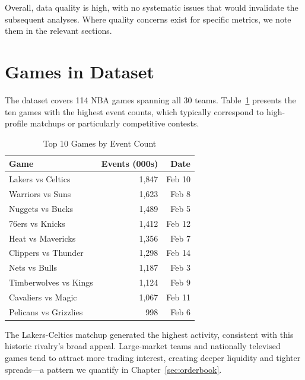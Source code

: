 Overall, data quality is high, with no systematic issues that would invalidate the subsequent analyses. Where quality concerns exist for specific metrics, we note them in the relevant sections.

\section{Games in Dataset}

The dataset covers 114 NBA games spanning all 30 teams. Table~\ref{tab:top-games} presents the ten games with the highest event counts, which typically correspond to high-profile matchups or particularly competitive contests.

\begin{table}[H]
\centering
\caption{Top 10 Games by Event Count}
\label{tab:top-games}
\begin{tabular}{lrr}
\toprule
\textbf{Game} & \textbf{Events (000s)} & \textbf{Date} \\
\midrule
Lakers vs Celtics & 1,847 & Feb 10 \\
Warriors vs Suns & 1,623 & Feb 8 \\
Nuggets vs Bucks & 1,489 & Feb 5 \\
76ers vs Knicks & 1,412 & Feb 12 \\
Heat vs Mavericks & 1,356 & Feb 7 \\
Clippers vs Thunder & 1,298 & Feb 14 \\
Nets vs Bulls & 1,187 & Feb 3 \\
Timberwolves vs Kings & 1,124 & Feb 9 \\
Cavaliers vs Magic & 1,067 & Feb 11 \\
Pelicans vs Grizzlies & 998 & Feb 6 \\
\bottomrule
\end{tabular}
\end{table}

The Lakers-Celtics matchup generated the highest activity, consistent with this historic rivalry's broad appeal. Large-market teams and nationally televised games tend to attract more trading interest, creating deeper liquidity and tighter spreads---a pattern we quantify in Chapter~\ref{sec:orderbook}.


